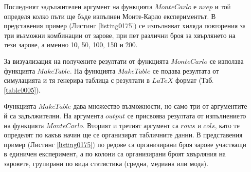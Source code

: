 Последният задължителен аргумент на функцията $MonteCarlo$ е $nrep$ и той определя колко пъти ще бъде изпълнен Монте-Карло експериментът. В представения пример (Листинг \ref{listing0175}) се изпълняват хиляда повторения за три възможни комбинации от зарове, при пет различни броя за хвърлянето на тези зарове, а именно 10, 50, 100, 150 и 200. 

\begin{table}[h]
\centering
{}
\caption{Сравнение на средна, медиана и мода за експеримент със зарове}
\label{table0005}
\end{table}

За визуализация на получените резултати от функцията $MonteCarlo$ се използва функцията $MakeTable$. На функцията $MakeTable$ се подава резултата от симулацията и тя генерира таблица с резултати в $LaTeX$ формат (Таб. \ref{table0005}).

Функцията $MakeTable$ дава множество възможности, но само три от аргументите й са задължителни. На аргумента $output$ се присвоява резултата от изпълнението на функцията $MonteCarlo$. Вторият и третият аргумент са $rows$ и $cols$, като те определят по какъв начин ще се организират табличните данни. В представения пример (Листинг \ref{listing0175}) по редове са организирани броя зарове участващи в единичен експеримент, а по колони са организирани броят хвърляния на заровете, групирани по вида статистика (средна, медиана или мода). 

